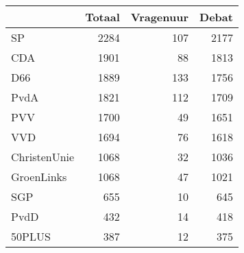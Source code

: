 \begin{tabular}{lrrr}
\toprule
{} &  Totaal &  Vragenuur &  Debat \\
\midrule
SP           &    2284 &        107 &   2177 \\
CDA          &    1901 &         88 &   1813 \\
D66          &    1889 &        133 &   1756 \\
PvdA         &    1821 &        112 &   1709 \\
PVV          &    1700 &         49 &   1651 \\
VVD          &    1694 &         76 &   1618 \\
ChristenUnie &    1068 &         32 &   1036 \\
GroenLinks   &    1068 &         47 &   1021 \\
SGP          &     655 &         10 &    645 \\
PvdD         &     432 &         14 &    418 \\
50PLUS       &     387 &         12 &    375 \\
\bottomrule
\end{tabular}
